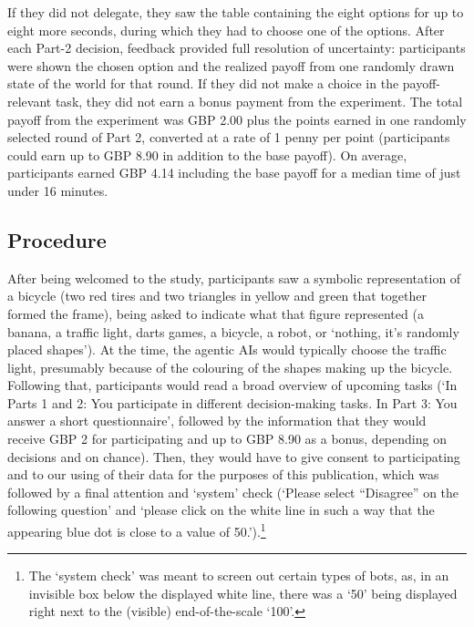 \documentclass[a4paper, 12pt, fleqn]{article}
\theoremstyle{definition}
\begin{document}
If they did not delegate, they saw the table containing the eight options for up to eight more seconds, during which they had to choose one of the options. After each Part-2 decision, feedback provided full resolution of uncertainty: participants were shown the chosen option and the realized payoff from one randomly drawn state of the world for that round. If they did not make a choice in the payoff-relevant task, they did not earn a bonus payment from the experiment. The total payoff from the experiment was GBP 2.00 plus the points earned in one randomly selected round of Part 2, converted at a rate of 1 penny per point (participants could earn up to GBP 8.90 in addition to the base payoff). On average, participants earned GBP 4.14 including the base payoff for a median time of just under 16 minutes.

\subsection{Procedure}
After being welcomed to the study, participants saw a symbolic representation of a bicycle (two red tires and two triangles in yellow and green that together formed the frame), being asked to indicate what that figure represented (a banana, a traffic light, darts games, a bicycle, a robot, or `nothing, it's randomly placed shapes'). At the time, the agentic AIs would typically choose the traffic light, presumably because of the colouring of the shapes making up the bicycle. Following that, participants would read a broad overview of upcoming tasks (`In Parts 1 and 2: You participate in different decision-making tasks. In Part 3: You answer a short questionnaire', followed by the information that they would receive GBP 2 for participating and up to GBP 8.90 as a bonus, depending on decisions and on chance). Then, they would have to give consent to participating and to our using of their data for the purposes of this publication, which was followed by a final 
attention and `system' check (`Please select ``Disagree'' on the following question' and `please click on the white line in such a way that the appearing blue dot is close to a value of 50.').\footnote{The `system check' was meant to screen out certain types of bots, as, in an invisible box below the displayed white line, there was a `50' being displayed right next to the (visible) end-of-the-scale `100'.}
\end{document}
